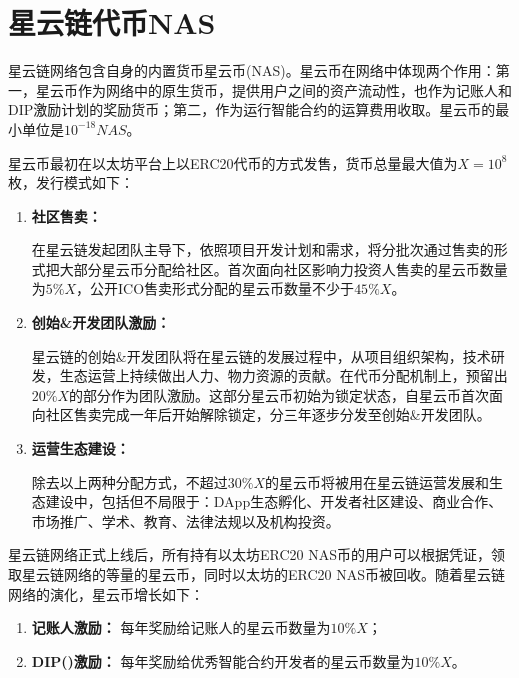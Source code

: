 \section{星云链代币NAS}
星云链网络包含自身的内置货币星云币(NAS)。星云币在网络中体现两个作用：第一，星云币作为网络中的原生货币，提供用户之间的资产流动性，也作为记账人和DIP激励计划的奖励货币；第二，作为运行智能合约的运算费用收取。星云币的最小单位是$10^{-18}NAS$。

星云币最初在以太坊平台上以ERC20代币的方式发售，货币总量最大值为$X=10^8$枚，发行模式如下：
\begin{enumerate}
	\item \textbf{社区售卖：}
	
在星云链发起团队主导下，依照项目开发计划和需求，将分批次通过售卖的形式把大部分星云币分配给社区。首次面向社区影响力投资人售卖的星云币数量为$5\%X$，公开ICO售卖形式分配的星云币数量不少于$45\%X$。

	\item \textbf{创始\&开发团队激励：}

星云链的创始\&开发团队将在星云链的发展过程中，从项目组织架构，技术研发，生态运营上持续做出人力、物力资源的贡献。在代币分配机制上，预留出$20\%X$的部分作为团队激励。这部分星云币初始为锁定状态，自星云币首次面向社区售卖完成一年后开始解除锁定，分三年逐步分发至创始\&开发团队。

	\item \textbf{运营生态建设：}

除去以上两种分配方式，不超过$30\%X$的星云币将被用在星云链运营发展和生态建设中，包括但不局限于：DApp生态孵化、开发者社区建设、商业合作、市场推广、学术、教育、法律法规以及机构投资。
\end{enumerate}

星云链网络正式上线后，所有持有以太坊ERC20 NAS币的用户可以根据凭证，领取星云链网络的等量的星云币，同时以太坊的ERC20 NAS币被回收。随着星云链网络的演化，星云币增长如下：
\begin{enumerate}
	\item \textbf{记账人激励：}
	每年奖励给记账人的星云币数量为$10\%X$；
	
	\item \textbf{DIP()激励：}
	每年奖励给优秀智能合约开发者的星云币数量为$10\%X$。
\end{enumerate}